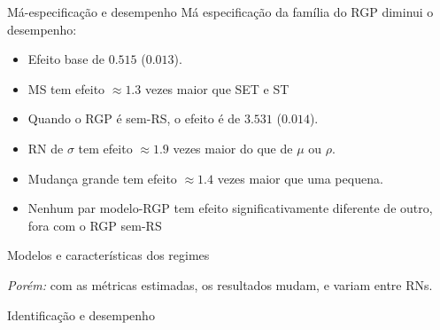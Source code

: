 \documentclass[
  ignorenonframetext,
  brazilian,
]{beamer}
\providecommand{\tightlist}{%
  \setlength{\itemsep}{0pt}\setlength{\parskip}{0pt}}\usepackage{longtable,booktabs,array}
\begin{document}
\begin{frame}{Má-especificação e desempenho}
\label{muxe1-especificauxe7uxe3o-e-desempenho}
Má especificação da família do RGP diminui o desempenho:

\begin{itemize}
\tightlist
\item
  Efeito base de \(0.515\) (\(0.013\)).
\item
  MS tem efeito \(\approx 1.3\) vezes maior que SET e ST
\item
  Quando o RGP é sem-RS, o efeito é de \(3.531\) (\(0.014\)).
\item
  RN de \(\sigma\) tem efeito \(\approx 1.9\) vezes maior do que de
  \(\mu\) ou \(\rho\).
\item
  Mudança grande tem efeito \(\approx 1.4\) vezes maior que uma pequena.
\item
  Nenhum par modelo-RGP tem efeito significativamente diferente de
  outro, fora com o RGP sem-RS
\end{itemize}
\end{frame}

\begin{frame}{Modelos e características dos regimes}
\label{modelos-e-caracteruxedsticas-dos-regimes}
\begin{table}[!htbp]

\caption{\label{tbl-mis_metrics_sim}Modelos e `perfis' de métricas
condicionais veradeiras}

\centering{

\vspace{-0.5cm}
\resizebox{\textwidth}{!}{%
}

}

\end{table}%

\emph{Porém:} com as métricas estimadas, os resultados mudam, e variam
entre RNs.
\end{frame}

\begin{frame}{Identificação e desempenho}
\label{identificauxe7uxe3o-e-desempenho}
\begin{table}[!htbp]

\caption{\label{tbl-match_r2}RMSE e identificação do fit e \(r\)}

\centering{

\vspace{-0.4cm}
\resizebox{0.8\textwidth}{!}{%
}

}

\end{table}%
\end{frame}
\end{document}
